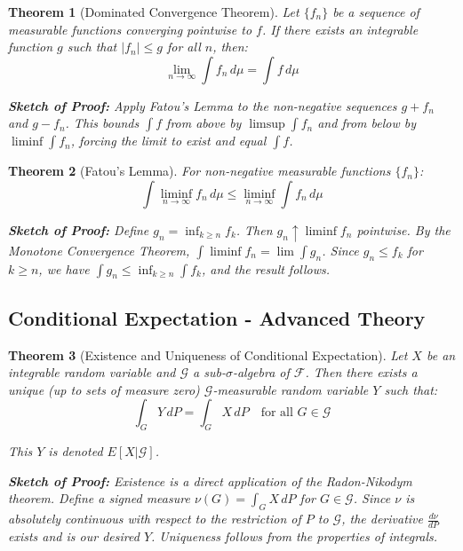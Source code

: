 \documentclass[12pt,a4paper]{article}
\newtheorem{theorem}{Theorem}[section]
\theoremstyle{remark}
\begin{document}
\begin{theorem}[Dominated Convergence Theorem]
Let $\{f_n\}$ be a sequence of measurable functions converging pointwise to $f$. If there exists an integrable function $g$ such that $|f_n| \leq g$ for all $n$, then:
$$\lim_{n \to \infty} \int f_n \, d\mu = \int f \, d\mu$$

\textbf{Sketch of Proof:} Apply Fatou's Lemma to the non-negative sequences $g+f_n$ and $g-f_n$. This bounds $\int f$ from above by $\limsup \int f_n$ and from below by $\liminf \int f_n$, forcing the limit to exist and equal $\int f$.
\end{theorem}

\begin{theorem}[Fatou's Lemma]
For non-negative measurable functions $\{f_n\}$:
$$\int \liminf_{n \to \infty} f_n \, d\mu \leq \liminf_{n \to \infty} \int f_n \, d\mu$$

\textbf{Sketch of Proof:} Define $g_n = \inf_{k \geq n} f_k$. Then $g_n \uparrow \liminf f_n$ pointwise. By the Monotone Convergence Theorem, $\int \liminf f_n = \lim \int g_n$. Since $g_n \leq f_k$ for $k \geq n$, we have $\int g_n \leq \inf_{k \geq n} \int f_k$, and the result follows.
\end{theorem}

\subsection{Conditional Expectation - Advanced Theory}

\begin{theorem}[Existence and Uniqueness of Conditional Expectation]
Let $X$ be an integrable random variable and $\mathcal{G}$ a sub-$\sigma$-algebra of $\mathcal{F}$. Then there exists a unique (up to sets of measure zero) $\mathcal{G}$-measurable random variable $Y$ such that:
$$\int_G Y \, dP = \int_G X \, dP \quad \text{for all } G \in \mathcal{G}$$

This $Y$ is denoted $E[X|\mathcal{G}]$.

\textbf{Sketch of Proof:} Existence is a direct application of the Radon-Nikodym theorem. Define a signed measure $\nu(G) = \int_G X \, dP$ for $G \in \mathcal{G}$. Since $\nu$ is absolutely continuous with respect to the restriction of $P$ to $\mathcal{G}$, the derivative $\frac{d\nu}{dP}$ exists and is our desired $Y$. Uniqueness follows from the properties of integrals.
\end{theorem}
\end{document}
